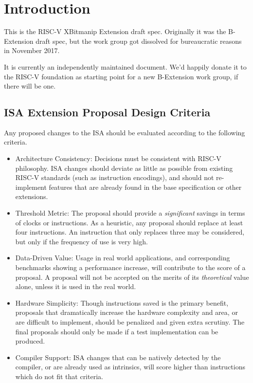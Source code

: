 \chapter{Introduction}

This is the RISC-V XBitmanip Extension draft spec. Originally it was the
B-Extension draft spec, but the work group got dissolved for bureaucratic
reasons in November 2017.

It is currently an independently maintained document. We'd happily donate
it to the RISC-V foundation as starting point for a new B-Extension work
group, if there will be one.

\section{ISA Extension Proposal Design Criteria}

Any proposed changes to the ISA should be evaluated according to the following
criteria.

\begin{itemize}
\item
  Architecture Consistency: Decisions must be consistent with RISC-V
  philosophy. ISA changes should deviate as little as possible from
  existing RISC-V standards (such as instruction encodings), and should
  not re-implement features that are already found in the base
  specification or other extensions.
\item
  Threshold Metric: The proposal should provide a \emph{significant}
  savings in terms of clocks or instructions. As a heuristic, any
  proposal should replace at least four instructions. An instruction
  that only replaces three may be considered, but only if the frequency
  of use is very high.
\item
  Data-Driven Value: Usage in real world applications, and corresponding
  benchmarks showing a performance increase, will contribute to the
  score of a proposal. A proposal will not be accepted on the merits of
  its \emph{theoretical} value alone, unless it is used in the real
  world.
\item
  Hardware Simplicity: Though instructions saved is the primary benefit,
  proposals that dramatically increase the hardware complexity and area,
  or are difficult to implement, should be penalized and given extra
  scrutiny. The final proposals should only be made if a test
  implementation can be produced.
\item
  Compiler Support: ISA changes that can be natively detected by the
  compiler, or are already used as intrinsics, will score higher than
  instructions which do not fit that criteria.
\end{itemize}

